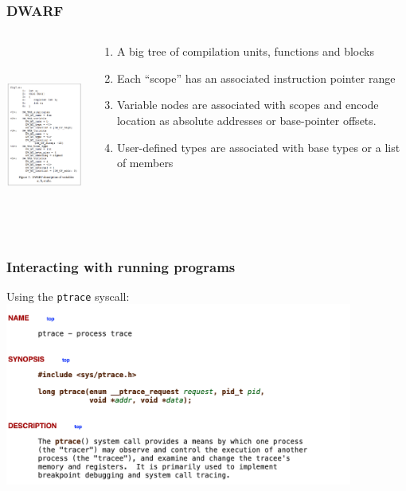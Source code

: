 \documentclass{beamer}
\begin{document}
\begin{frame}
\frametitle{DWARF}
\begin{columns}
\begin{column}{0.48\textwidth}
\includegraphics[height=6cm]{dwarf}
\end{column}
\begin{column}{0.48\textwidth}
\begin{enumerate}
\item{A big tree of compilation units, functions and blocks}
\item{Each ``scope'' has an associated instruction pointer range}
\item{Variable nodes are associated with scopes and encode location as absolute addresses or base-pointer offsets.}
\item{User-defined types are associated with base types or a list of members}
\end{enumerate}
\end{column}
\end{columns}
\end{frame}

\begin{frame}
\frametitle{Interacting with running programs}
Using the \texttt{ptrace} syscall:
\includegraphics[height=6cm]{ptrace}
\end{frame}
\end{document}
